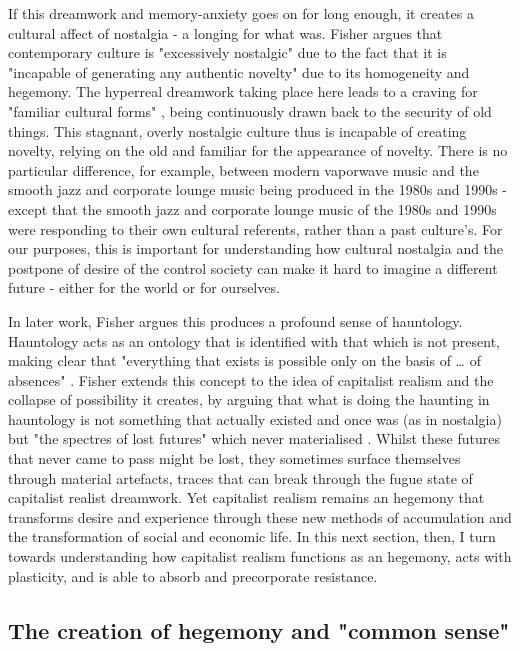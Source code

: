 If this dreamwork and memory-anxiety goes on for long enough, it creates a cultural affect of nostalgia - a longing for what was. Fisher argues that contemporary culture is "excessively nostalgic" due to the fact that it is "incapable of generating any authentic novelty" \citep[63]{fisher_capitalist_2009} due to its homogeneity and hegemony. The hyperreal dreamwork taking place here leads to a craving for "familiar cultural forms" \citep[63]{fisher_capitalist_2009}, being continuously drawn back to the security of old things. This stagnant, overly nostalgic culture thus is incapable of creating novelty, relying on the old and familiar for the appearance of novelty. There is no particular difference, for example, between modern vaporwave music and the smooth jazz and corporate lounge music being produced in the 1980s and 1990s - except that the smooth jazz and corporate lounge music of the 1980s and 1990s were responding to their own cultural referents, rather than a past culture's. For our purposes, this is important for understanding how  cultural nostalgia and the postpone of desire of the control society can make it hard to imagine a different future - either for the world or for ourselves.

In later work,  Fisher argues this produces a profound sense of hauntology. Hauntology acts as an ontology that is identified with that which is not present, making clear that "everything that exists is possible only on the basis of \ldots{} of absences" \citep[187]{fisher_ghosts_2014}. Fisher extends this concept to the idea of capitalist realism and the collapse of possibility it creates, by arguing that what is doing the haunting in hauntology is not something that actually existed and once was (as in nostalgia) but "the spectres of lost futures" which never materialised \citep[21]{fisher_ghosts_2014}. Whilst these futures that never came to pass might be lost, they sometimes surface themselves through material artefacts, traces that can break through the fugue state of capitalist realist dreamwork. Yet capitalist realism remains an hegemony that transforms desire and experience through these new methods of accumulation and the transformation of social and economic life. In this next section, then, I turn towards understanding how capitalist realism functions as an hegemony, acts with plasticity, and is able to absorb and precorporate resistance.

\subsection{The creation of hegemony and "common sense"}
\label{the-creation-of-hegemony-and-common-sense}

